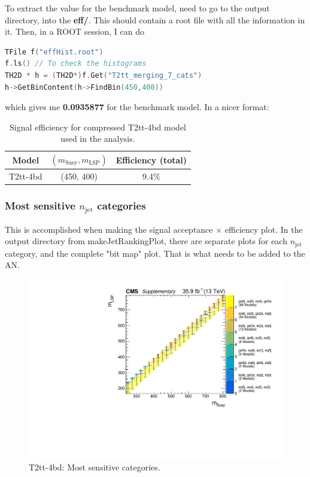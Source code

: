 To extract the value for the benchmark model, need to go to the output directory, into the \textbf{eff/}. This should contain a root file with all the information in it. Then, in a ROOT session, I can do

\begin{lstlisting}[belowskip=-0.7cm, language=C++, numbers=none]
TFile f("effHist.root")
f.ls() // To check the histograms
TH2D * h = (TH2D*)f.Get("T2tt_merging_7_cats")
h->GetBinContent(h->FindBin(450,400))
\end{lstlisting}

which gives me \textbf{0.0935877} for the benchmark model. In a nicer format:

\begin{table}[H]
    \caption{Signal efficiency for compressed T2tt-4bd model used in the analysis.}
    \label{tab:sig-effT2ttBenchmark}
    \centering
    \begin{tabular}{ ccc }
        \hline \hline
        Model & $(m_{\mathrm{Susy}},m_{\mathrm{LSP}})$ & Efficiency (total) \\
        \hline
        T2tt-4bd & (450, 400) & 9.4\% \\
        \hline \hline
        \end{tabular}
        \end{table}


\subsubsection{Most sensitive \texorpdfstring{$n_{\mathrm{jet}}$}{njet} categories}

This is accomplished when making the signal acceptance $\times$ efficiency plot. In the output directory from makeJetRankingPlot, there are separate plots for each $n_{\mathrm{jet}}$ category, and the complete "bit map" plot. That is what needs to be added to the AN.

\begin{figure}[H]
\centering
\includegraphics[width=120mm]{./sec31/T2tt_bitMap_improved.pdf}
\caption{T2tt-4bd: Most sensitive categories.}
\end{figure}



